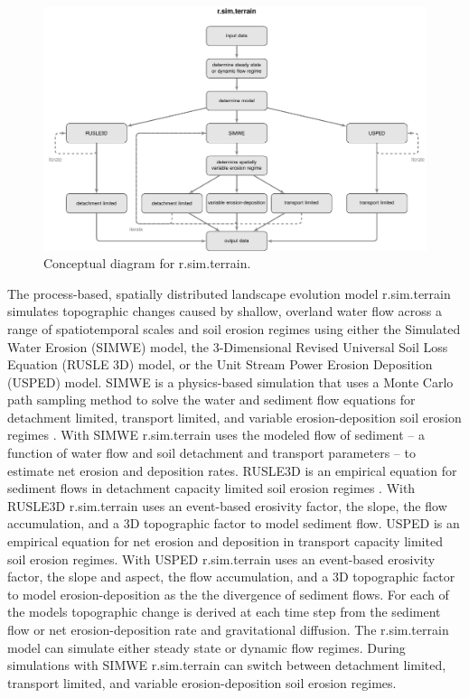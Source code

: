 \documentclass[gmd, manuscript]{copernicus}
\begin{document}

\begin{figure}%
\center
\includegraphics[width=\textwidth,keepaspectratio]{figures/concept.pdf}
\caption{Conceptual diagram for r.sim.terrain.}
\label{fig:evolution}
\end{figure}


The process-based, spatially distributed 
landscape evolution model r.sim.terrain
simulates topographic changes
caused by shallow, overland water flow
across a range of spatiotemporal scales and soil erosion regimes
using either
the Simulated Water Erosion (SIMWE) model, 
the 3-Dimensional Revised Universal Soil Loss Equation (RUSLE 3D) model,
or the Unit Stream Power Erosion Deposition (USPED) model.  
SIMWE is a physics-based simulation
that uses a Monte Carlo path sampling method
to solve the water and sediment flow equations 
for detachment limited, transport limited, and variable erosion-deposition 
soil erosion regimes \citep{Mitasova2004}. 
With SIMWE 
r.sim.terrain
uses the modeled flow of sediment 
-- a function of water flow and soil detachment and transport parameters -- 
to estimate net erosion and deposition rates. 
RUSLE3D is an empirical equation for sediment flows 
in detachment capacity limited soil erosion regimes \citep{Mitasova1996}. 
With RUSLE3D
r.sim.terrain
uses an event-based erosivity factor, 
the slope, the flow accumulation, and a 3D topographic factor
to model sediment flow. 
USPED is an empirical equation for net erosion and deposition 
in transport capacity limited soil erosion regimes. 
With USPED 
r.sim.terrain
uses an event-based erosivity factor, 
the slope and aspect, the flow accumulation, and a 3D topographic factor
to model erosion-deposition as the
the divergence of sediment flows. 
For each of the models 
topographic change is derived at each time step
from the sediment flow or net erosion-deposition rate
and gravitational diffusion.
The r.sim.terrain model
can simulate either steady state or dynamic flow regimes.
During simulations with SIMWE 
r.sim.terrain
can switch between 
detachment limited, transport limited, and variable erosion-deposition 
soil erosion regimes.
\end{document}

